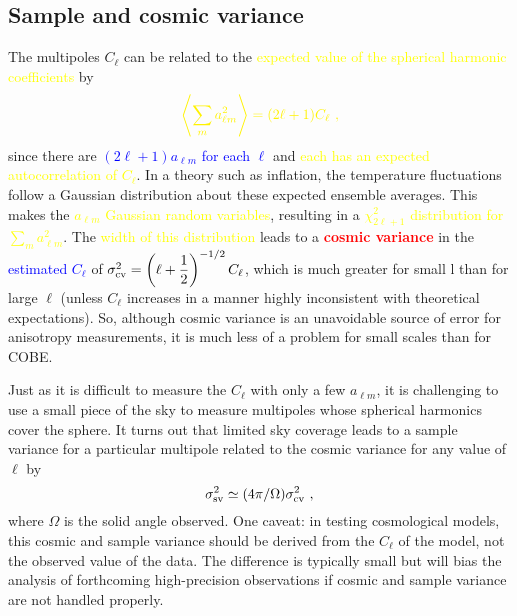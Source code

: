 \documentclass[12pt,a4paper]{article}
\begin{document}
\subsection{Sample and cosmic variance}
\cite{2000PhR...333..245G} The multipoles $C_\ell$ can be related to the  \textcolor{yellow}{expected value of the spherical harmonic coefficients} by
\begin{equation}
\color{yellow} \left\langle \sum_m a_{\ell m}^2 \right\rangle = (2\ell +1) C_\ell ~,
\end{equation}
since there are  \textcolor{blue}{$(2 \ell+1) a_{\ell m}$ for each $\ell$} and  \textcolor{yellow}{each has an expected autocorrelation of $C_\ell$}. In a theory such as inflation, the temperature fluctuations follow a Gaussian distribution about these expected ensemble averages. This makes the  \textcolor{yellow}{$a_{\ell m}$ Gaussian random variables}, resulting in a \textcolor{yellow}{$\chi^2_{2\ell +1}$ distribution for $\sum_m a^2_{\ell m}$}. The  \textcolor{yellow}{width of this distribution} leads to a  \textcolor{red}{\bf cosmic variance} in the \textcolor{blue}{estimated $C_{\ell}$} of  \textcolor{yellow}{$\sigma^2_{\rm cv} = \left(\ell +\dfrac{1}{2} \right)^{-1/2} C_{\ell}$}, which is much greater for small l than for large $\ell$ (unless $C_\ell$ increases in a manner highly inconsistent with theoretical expectations). So, although cosmic variance is an unavoidable source of error for anisotropy measurements, it is much less of a problem for small scales than for COBE.

Just as it is difficult to measure the $C_\ell$ with only a few $a_{\ell m}$, it is challenging to use a small piece of the sky to measure multipoles whose spherical harmonics cover the sphere. It turns out that limited sky coverage leads to a sample variance for a particular multipole related to the cosmic variance for any value of $\ell$ by
\begin{equation}
\sigma^2_{\rm sv} \simeq (4\pi/\Omega) \sigma^2_{\rm cv} ~,
\end{equation}
where $\Omega$ is the solid angle observed. One caveat: in testing cosmological models, this cosmic and sample variance should be derived from the $C_\ell$ of the model, not the observed value of the data. The difference is typically small but will bias the analysis of forthcoming high-precision observations if cosmic and sample variance are not handled properly.
\end{document}
